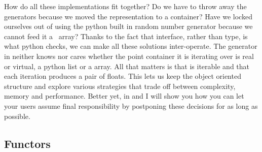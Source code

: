 How do all these implementations fit together? Do we have to throw away the generators because
we moved the representation to a  container? Have we locked ourselves out of
using the python built in random number generator because we cannot feed it a \cc\ array?
Thanks to the fact that interface, rather than type, is what python checks, we can make all
these solutions inter-operate. The generator  in
 neither knows nor cares whether the point container it is
iterating over is real or virtual, a python list or a  array. All that
matters is that  is iterable and that each iteration produces a pair of
floats. This lets us keep the object oriented structure and explore various strategies that
trade off between complexity, memory and performance. Better yet, in  and
 I will show you how you can let your users assume final responsibility by
postponing these decisions for as long as possible.

\subsection{Functors}
\label{sec:classes:functors}

